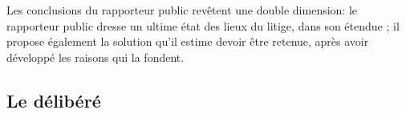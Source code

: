 \documentclass[10pt, a4paper, openany]{book}
\begin{document}
Les conclusions du rapporteur public revêtent une double dimension: le rapporteur public dresse un ultime état des lieux du litige, dans son étendue ; il propose également la solution qu'il estime devoir être retenue, après avoir développé les raisons qui la fondent. 


\subsection{Le délibéré}
\end{document}
